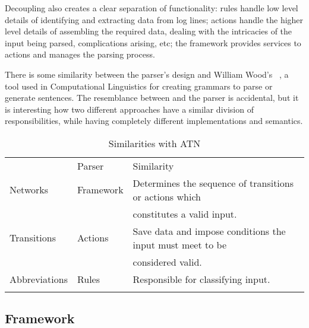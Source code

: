 \documentclass[draft]{svmult}
\begin{document}
Decoupling also creates a clear separation of functionality: rules handle
low level details of identifying and extracting data from log lines;
actions handle the higher level details of assembling the required data,
dealing with the intricacies of the input being parsed, complications
arising, etc; the framework provides services to actions and manages the
parsing process.

There is some similarity between the parser's design and William Wood's
\ATN{}~\cite{atns, nlpip}, a tool used in Computational Linguistics for
creating grammars to parse or generate sentences.  The resemblance between
\ATN{} and the parser is accidental, but it is interesting how two
different approaches have a similar division of responsibilities, while
having completely different implementations and semantics.


\begin{table}[ht]
    \caption{Similarities with ATN}\label{Similarities with ATN}
    \begin{tabular}[]{lll}
        \hline
        \noalign{\smallskip}
        \ATN{}        & Parser    & Similarity                          \\
        \noalign{\smallskip}
        \hline
        \noalign{\smallskip}
        Networks      & Framework & Determines the sequence of
                                    transitions or actions which        \\
                      &           & constitutes a valid input.          \\
        Transitions   & Actions   & Save data and impose conditions the
                                    input must meet to be               \\
                      &           & considered valid.                   \\
        Abbreviations & Rules     & Responsible for classifying input.  \\
        \noalign{\smallskip}
        \hline
        \noalign{\smallskip}
    \end{tabular}
\end{table}

\subsection{Framework}

\label{Framework}
\end{document}
